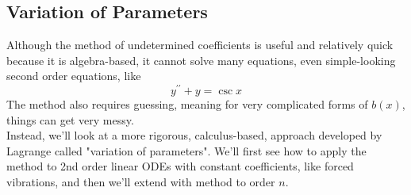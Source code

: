\subsection{Variation of Parameters}
\noindent
Although the method of undetermined coefficients is useful and relatively quick because it is algebra-based, it cannot solve many equations, even simple-looking second order equations, like
\begin{equation*}
	y^{\prime\prime} + y = \csc{x}
\end{equation*}
The method also requires guessing, meaning for very complicated forms of $b(x)$, things can get very messy.\\

\noindent
Instead, we'll look at a more rigorous, calculus-based, approach developed by Lagrange called "variation of parameters". We'll first see how to apply the method to 2nd order linear ODEs with constant coefficients, like forced vibrations, and then we'll extend with method to order $n$.


